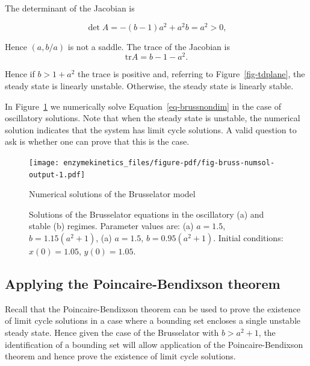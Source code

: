 \documentclass[
  letterpaper,
  DIV=11,
  numbers=noendperiod]{scrreprt}
\begin{document}
The determinant of the Jacobian is

\[
\det{A}=-(b-1)a^2+a^2b=a^2>0,
\]

Hence \((a,b/a)\) is not a saddle. The trace of the Jacobian is \[
\mathrm{tr} A=b-1-a^2.
\]

Hence if \(b>1+a^2\) the trace is positive and, referring to
Figure~\ref{fig-tdplane}, the steady state is linearly unstable.
Otherwise, the steady state is linearly stable.

In Figure~\ref{fig-bruss-numsol} we numerically solve
Equation~\ref{eq-brussnondim} in the case of oscillatory solutions. Note
that when the steady state is unstable, the numerical solution indicates
that the system has limit cycle solutions. A valid question to ask is
whether one can prove that this is the case.

\begin{figure}

{\centering \texttt{[image: enzymekinetics\_files/figure-pdf/fig-bruss-numsol-output-1.pdf]}

}

\caption{\label{fig-bruss-numsol}Numerical solutions of the Brusselator
model}

\end{figure}

\begin{figure}
\centering
{}
\caption{Solutions of the Brusselator equations in the oscillatory (a) and stable (b) regimes. Parameter values are: (a) $a=1.5$, $b=1.15(a^2+1)$, (a) $a=1.5$, $b=0.95(a^2+1)$. Initial conditions: $x(0)=1.05$, $y(0)=1.05$.}
\label{BrussNondimFig}
\end{figure}

\hypertarget{applying-the-poincaire-bendixson-theorem}{%
\subsection{Applying the Poincaire-Bendixson
theorem}\label{applying-the-poincaire-bendixson-theorem}}

Recall that the Poincaire-Bendixson theorem can be used to prove the
existence of limit cycle solutions in a case where a bounding set
encloses a single unstable steady state. Hence given the case of the
Brusselator with \(b>a^2+1\), the identification of a bounding set will
allow application of the Poincaire-Bendixson theorem and hence prove the
existence of limit cycle solutions.
\end{document}
